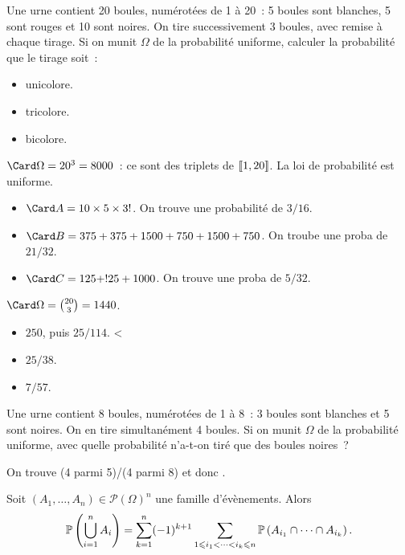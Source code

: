 \documentclass{magnolia}
\begin{document}
\begin{exos}
  \exo Une urne contient 20 boules, numérotées de 1 à 20~: 5 boules sont blanches,
  5 sont rouges et 10 sont noires.
  On tire successivement 3 boules, avec remise à chaque tirage.
  Si on munit $\Omega$ de la probabilité uniforme,
  calculer la probabilité que
    le tirage soit~:
    \begin{itemize}
  \item unicolore.
  \item tricolore.
  \item bicolore.
    \end{itemize}
  \begin{sol}
  \begin{questions}
  \question $\Card\Omega=20^3=8000$~: ce sont des triplets de $\left\llbracket 1,20\right\rrbracket$. La loi de probabilité est uniforme.
    \begin{itemize}
    \item $\Card A=10\times 5\time 5\times 3!$. On trouve une probabilité de $3/16$.
    \item $\Card B=375+375+1500+750+1500+750$. On troube une proba de $21/32$.
    \item $\Card C=125+!25+1000$. On trouve une proba de $5/32$.
    \end{itemize}
  \question $\Card\Omega=\binom{20}{3}=1440$.
    \begin{itemize}
    \item $250$, puis $25/114$.
<    \item $25/38$.
    \item $7/57$.
    \end{itemize}
  \end{questions}
  \end{sol}
  \exo Une urne contient 8 boules, numérotées de 1 à 8~: 3 boules sont blanches et
    5 sont noires. On en tire simultanément 4 boules.
    Si on munit $\Omega$ de la probabilité uniforme, avec quelle probabilité
    n'a-t-on tiré que des boules noires~?
    \begin{sol}
    On trouve (4 parmi 5)/(4 parmi 8) et donc .
    \end{sol}
\end{exos}

\begin{proposition}[nom={Formule du crible}]
Soit $(A_1,\ldots,A_n)\in\mathcal{P}(\Omega)^n$ une famille d'évènements. Alors
  \[\mathbb{P}\left(\bigcup_{i=1}^n A_i\right)=\sum_{k=1}^n (-1)^{k+1}
    \sum_{1\leqslant i_1<\cdots<i_k\leqslant n}
    \mathbb{P}\left(A_{i_1}\cap\cdots\cap A_{i_k}\right).\]
\end{proposition}
\end{document}
